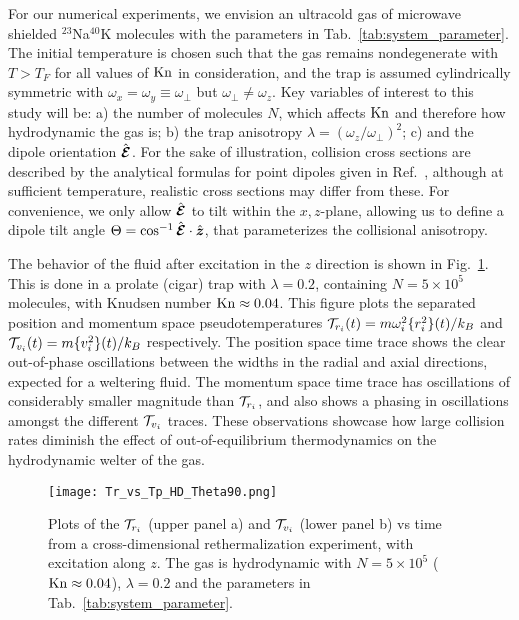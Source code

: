 \documentclass[reprint, amsmath, amssymb, aps, superscriptaddress]{revtex4-1}
\begin{document}
For our numerical experiments, we envision an ultracold gas of microwave shielded $^{23}$Na$^{40}$K molecules with the parameters in Tab.~\ref{tab:system_parameter}. The initial temperature is chosen such that the gas remains nondegenerate with $T > T_F$ \cite{Butts97_PRA} for all values of ${\rm Kn}$ in consideration, and the trap is assumed cylindrically symmetric with $\omega_x = \omega_y \equiv \omega_{\perp}$ but $\omega_{\perp} \neq \omega_z$.
Key variables of interest to this study will be: 
a) the number of molecules $N$, which affects ${\rm Kn}$ and therefore how hydrodynamic the gas is; b) the trap anisotropy $\lambda = ( \omega_z / \omega_{\perp} )^2$; c) and the dipole orientation $\hat{\boldsymbol{{\cal E}}}$. For the sake of illustration, collision cross sections are described by the analytical formulas for point dipoles given in Ref.~\cite{Bohn14_PRA}, although at sufficient temperature, realistic cross sections may differ from these.
For convenience, we only allow $\hat{\boldsymbol{{\cal E}}}$ to tilt within the $x,z$-plane, allowing us to define a dipole tilt angle $\Theta = \cos^{-1}\hat{\boldsymbol{{\cal E}}} \cdot \hat{\boldsymbol{z}}$, that parameterizes the collisional anisotropy.  



The behavior of the fluid after excitation in the $z$ direction is shown in Fig.~\ref{fig:Tr_vs_Tp_HD_Theta90}.
This is done in a prolate (cigar) trap with $\lambda = 0.2$, containing $N = 5 \times 10^{5}$ molecules, with Knudsen number ${\rm Kn} \approx 0.04$. 
This figure  plots  the separated position and momentum space pseudotemperatures ${\cal T}_{r_i}(t) = m \omega_i^2 \{ r_i^2 \}(t) / k_B$ and ${\cal T}_{v_i}(t) = m \{ v_i^2 \}(t) / k_B$ respectively. The position space time trace shows the clear out-of-phase oscillations between the widths in the radial and axial directions, expected for a weltering fluid. 
The momentum space time trace has oscillations of considerably smaller magnitude than ${\cal T}_{r_i}$, and also shows a phasing in oscillations amongst the different ${\cal T}_{v_i}$ traces. These observations showcase how large collision rates diminish the effect of out-of-equilibrium thermodynamics on the hydrodynamic welter of the gas. 

\begin{figure}[ht]
    \centering
    \texttt{[image: Tr\_vs\_Tp\_HD\_Theta90.png]}
    \caption{ Plots of the ${\cal T}_{r_i}$ (upper panel a) and ${\cal T}_{v_i}$ (lower panel b) vs time from a cross-dimensional rethermalization experiment, with excitation along $z$. The gas is hydrodynamic with $N = 5 \times 10^5$ (${\rm Kn} \approx 0.04$), $\lambda = 0.2$ and the parameters in Tab.~\ref{tab:system_parameter}. }
    \label{fig:Tr_vs_Tp_HD_Theta90}
\end{figure}
\end{document}
